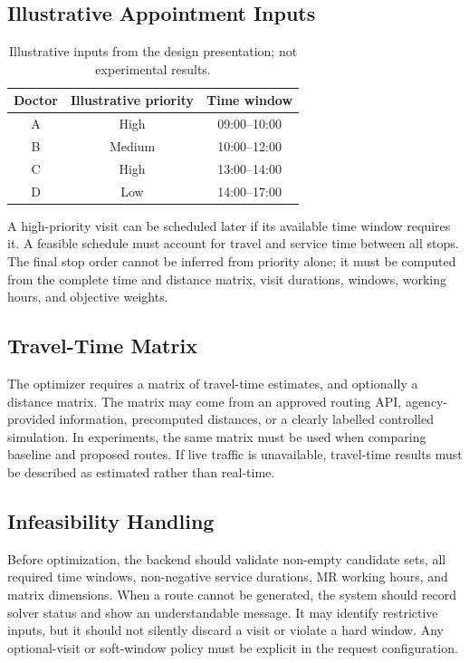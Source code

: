 \documentclass[12pt,a4paper,oneside]{report}
\begin{document}
\subsection{Illustrative Appointment Inputs}
\begin{table}[htbp]
\centering
\begin{tabular}{c c c}
\toprule
\textbf{Doctor} & \textbf{Illustrative priority} & \textbf{Time window}\\
\midrule
A & High & 09:00--10:00\\
B & Medium & 10:00--12:00\\
C & High & 13:00--14:00\\
D & Low & 14:00--17:00\\
\bottomrule
\end{tabular}
\caption{Illustrative inputs from the design presentation; not experimental results.}
\label{tab:illustrative-doctors}
\end{table}

A high-priority visit can be scheduled later if its available time window requires it. A feasible schedule must account for travel and service time between all stops. The final stop order cannot be inferred from priority alone; it must be computed from the complete time and distance matrix, visit durations, windows, working hours, and objective weights.

\subsection{Travel-Time Matrix}
The optimizer requires a matrix of travel-time estimates, and optionally a distance matrix. The matrix may come from an approved routing API, agency-provided information, precomputed distances, or a clearly labelled controlled simulation. In experiments, the same matrix must be used when comparing baseline and proposed routes. If live traffic is unavailable, travel-time results must be described as estimated rather than real-time.

\subsection{Infeasibility Handling}
Before optimization, the backend should validate non-empty candidate sets, all required time windows, non-negative service durations, MR working hours, and matrix dimensions. When a route cannot be generated, the system should record solver status and show an understandable message. It may identify restrictive inputs, but it should not silently discard a visit or violate a hard window. Any optional-visit or soft-window policy must be explicit in the request configuration.
\end{document}

